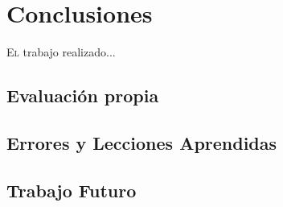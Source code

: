 \chapter{Conclusiones}
\label{chap:conclusiones}
\vspace{0.5cm}


 \lettrine{E}{l} trabajo realizado...

\section{Evaluación propia}
\section{Errores y Lecciones Aprendidas}
\section{Trabajo Futuro}
